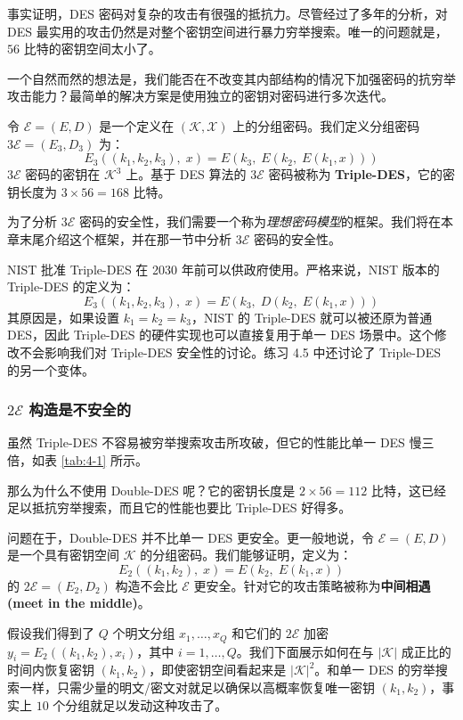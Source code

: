 事实证明，DES 密码对复杂的攻击有很强的抵抗力。尽管经过了多年的分析，对 DES 最实用的攻击仍然是对整个密钥空间进行暴力穷举搜索。唯一的问题就是，$56$ 比特的密钥空间太小了。

一个自然而然的想法是，我们能否在不改变其内部结构的情况下加强密码的抗穷举攻击能力？最简单的解决方案是使用独立的密钥对密码进行多次迭代。

令 $\mathcal{E}=(E,D)$ 是一个定义在 $(\mathcal{K},\mathcal{X})$ 上的分组密码。我们定义分组密码 $3\mathcal{E}=(E_3,D_3)$ 为：
\[
E_3((k_1,k_2,k_3),\;x)=E(k_3,\;E(k_2,\;E(k_1,x)))
\]
$3\mathcal{E}$ 密码的密钥在 $\mathcal{K}^3$ 上。基于 DES 算法的 $3\mathcal{E}$ 密码被称为 \textbf{Triple-DES}，它的密钥长度为 $3\times56=168$ 比特。

\begin{snote}[安全性。]
为了分析 $3\mathcal{E}$ 密码的安全性，我们需要一个称为\emph{理想密码模型}的框架。我们将在本章末尾介绍这个框架，并在那一节中分析 $3\mathcal{E}$ 密码的安全性。
\end{snote}

\begin{snote}
NIST 批准 Triple-DES 在 2030 年前可以供政府使用。严格来说，NIST 版本的 Triple-DES 的定义为：
\[
E_3((k_1,k_2,k_3),\;x)=E(k_3,\;D(k_2,\;E(k_1,x)))
\]
其原因是，如果设置 $k_1=k_2=k_3$，NIST 的 Triple-DES 就可以被还原为普通 DES，因此 Triple-DES 的硬件实现也可以直接复用于单一 DES 场景中。这个修改不会影响我们对 Triple-DES 安全性的讨论。练习 4.5 中还讨论了 Triple-DES 的另一个变体。
\end{snote}

\subsubsection{$2\mathcal{E}$ 构造是不安全的}

虽然 Triple-DES 不容易被穷举搜索攻击所攻破，但它的性能比单一 DES 慢三倍，如表 \ref{tab:4-1} 所示。

那么为什么不使用 Double-DES 呢？它的密钥长度是 $2\times56=112$ 比特，这已经足以抵抗穷举搜索，而且它的性能也要比 Triple-DES 好得多。

问题在于，Double-DES 并不比单一 DES 更安全。更一般地说，令 $\mathcal{E}=(E,D)$ 是一个具有密钥空间 $\mathcal{K}$ 的分组密码。我们能够证明，定义为：
\[
E_2((k_1,k_2),\;x)=E(k_2,\;E(k_1,x))
\]
的 $2\mathcal{E}=(E_2,D_2)$ 构造不会比 $\mathcal{E}$ 更安全。针对它的攻击策略被称为\textbf{中间相遇 (meet in the middle)}。

假设我们得到了 $Q$ 个明文分组 $x_1,\dots,x_Q$ 和它们的 $2\mathcal{E}$ 加密 $y_i=E_2((k_1,k_2),x_i)$，其中 $i=1,\dots,Q$。我们下面展示如何在与 $|\mathcal{K}|$ 成正比的时间内恢复密钥 $(k_1,k_2)$，即使密钥空间看起来是 $|\mathcal{K}|^2$。和单一 DES 的穷举搜索一样，只需少量的明文/密文对就足以确保以高概率恢复唯一密钥 $(k_1,k_2)$，事实上 $10$ 个分组就足以发动这种攻击了。

